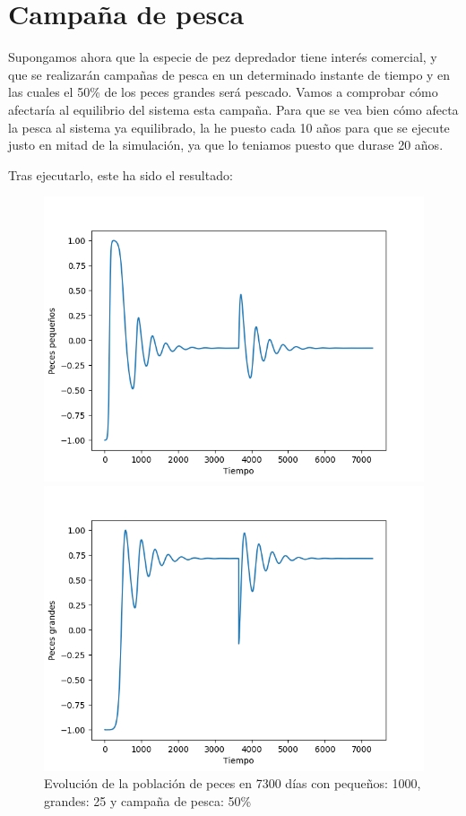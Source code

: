 \documentclass[11pt,a4paper]{report}
\begin{document}
\section{Campaña de pesca}

Supongamos ahora que la especie de pez depredador tiene interés comercial, y que se realizarán campañas de pesca en un determinado instante
de tiempo y en las cuales el 50\% de los peces grandes será pescado. Vamos a comprobar cómo afectaría al equilibrio del sistema esta campaña.
Para que se vea bien cómo afecta la pesca al sistema ya equilibrado, la he puesto cada 10 años para que se ejecute justo en mitad de la
simulación, ya que lo teniamos puesto que durase 20 años.

Tras ejecutarlo, este ha sido el resultado:

\begin{figure}[H]
	\begin{minipage}{0.5\textwidth}
	  \centering
	  \includegraphics[scale=0.45]{img/pequenios-4000-25-pesca.png}
	\end{minipage}
	\begin{minipage}{0.5\textwidth}
	  \centering
	  \includegraphics[scale=0.45]{img/grandes-4000-25-pesca.png}
	\end{minipage}
	\caption{Evolución de la población de peces en 7300 días con pequeños: 1000, grandes: 25 y campaña de pesca: 50\%}
\end{figure}
\end{document}
